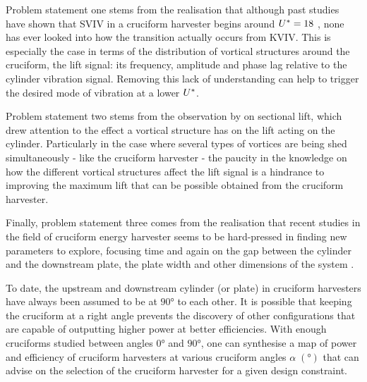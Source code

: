 \documentclass[oneside]{utmthesis}
\begin{document}
Problem statement one stems from the realisation that although past studies have shown that SVIV in a cruciform harvester begins around $U^{*} = 18$ \citep{Koide2013}, none has ever looked into how the transition actually occurs from KVIV. This is especially the case in terms of the distribution of vortical structures around the cruciform, the lift signal: its frequency, amplitude and phase lag relative to the cylinder vibration signal. Removing this lack of understanding can help to trigger the desired mode of vibration at a lower $U^{*}$.

Problem statement two stems from the observation by \citet{Zhao2018a} on sectional lift, which drew attention to the effect a vortical structure has on the lift acting on the cylinder. Particularly in the case where several types of vortices are being shed simultaneously - like the cruciform harvester - the paucity in the knowledge on how the different vortical structures affect the lift signal is a hindrance to improving the maximum lift that can be possible obtained from the cruciform harvester.

Finally, problem statement three comes from the realisation that recent studies in the field of cruciform energy harvester seems to be hard-pressed in finding new parameters to explore, focusing time and again on the gap between the cylinder and the downstream plate, the plate width and other dimensions of the system \citep{Sakamoto2021}.

To date, the upstream and downstream cylinder (or plate) in cruciform harvesters have always been assumed to be at $90 \si{\degree}$ to each other. It is possible that keeping the cruciform at a right angle prevents the discovery of other configurations that are capable of outputting higher power at better efficiencies. With enough cruciforms studied between angles $0 \si{\degree}$ and $90 \si{\degree}$, one can synthesise a map of power and efficiency of cruciform harvesters at various cruciform angles $\alpha \; (\si{\degree})$ that can advise on the selection of the cruciform harvester for a given design constraint.
\end{document}
